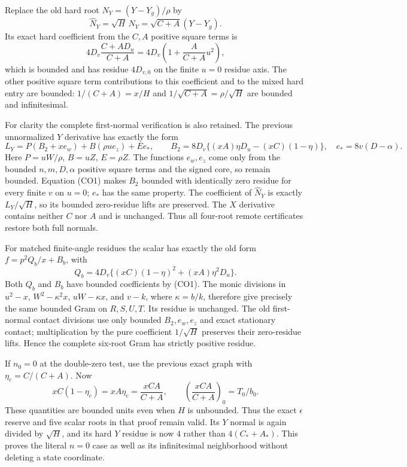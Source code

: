 Replace the old hard root $N_Y=(Y-Y_g)/\rho$ by
\[
        \widehat N_Y=\sqrt H\,N_Y=\sqrt{C+A}(Y-Y_g).
                                                               \tag{CO3}
\]
Its exact hard coefficient from the $C,A$ positive square terms is
\[
             4D_v\frac{C+AD_u}{C+A}
       =4D_v\left(1+\frac{A}{C+A}u^2\right),             \tag{CO4}
\]
which is bounded and has residue $4D_{v,0}$ on the finite $u=0$
residue axis.  The other positive square term contributions to this coefficient
and to the mixed hard entry are bounded: $1/(C+A)=x/H$ and
$1/\sqrt{C+A}=\rho/\sqrt H$ are bounded and infinitesimal.

For clarity the complete first-normal verification is also retained.
The previous unnormalized $Y$ derivative has exactly the form
\[
 L_Y=P(B_2+xe_w)+B(\rho u e_z)+E e_*,\qquad
 B_2=8D_v\{(xA)\eta D_u-(xC)(1-\eta)\},
 \quad e_*=8v(D-\alpha).                                \tag{CO5}
\]
Here $P=uW/\rho$, $B=uZ$, $E=\rho Z$.  The functions $e_w,e_z$
come only from the bounded $n,m,D,\alpha$ positive square terms and the signed
core, so remain bounded.  Equation (CO1) makes $B_2$ bounded with
identically zero residue for every finite $v$ on $u=0$; $e_*$ has
the same property.  The coefficient of $\widehat N_Y$ is exactly
$L_Y/\sqrt H$, so its bounded zero-residue lifts are preserved.
The $X$ derivative contains neither $C$ nor $A$ and is unchanged.
Thus all four-root remote certificates restore both full normals.

For matched finite-angle residues the scalar has exactly the old
form $f=p^2Q_b/x+B_b$, with
\[
 Q_b=4D_v\{(xC)(1-\eta)^2+(xA)\eta^2D_u\}.
\]
Both $Q_b$ and $B_b$ have bounded coefficients by (CO1).  The monic
divisions in $u^2-x$, $W^2-\kappa^2x$, $uW-\kappa x$, and $v-k$,
where $\kappa=b/k$, therefore give precisely the same bounded Gram
on $R,S,U,T$.  Its residue is unchanged.  The old first-normal
contact divisions use only bounded $B_2,e_w,e_z$ and exact stationary
contact; multiplication by the pure coefficient $1/\sqrt H$
preserves their zero-residue lifts.  Hence the complete six-root
Gram has strictly positive residue.

If $n_0=0$ at the double-zero test, use the previous exact graph
with $\eta_c=C/(C+A)$.  Now
\[
 xC(1-\eta_c)=xA\eta_c=\frac{xCA}{C+A},
 \qquad
 \left(\frac{xCA}{C+A}\right)_0=T_0/b_0.                \tag{CO6}
\]
These quantities are bounded units even when $H$ is unbounded.
Thus the exact $\epsilon$ reserve and five scalar roots in that
proof remain valid.  Its $Y$ normal is again divided by $\sqrt H$,
and its hard $Y$ residue is now $4$ rather than $4(C_*+A_*)$.
This proves the literal $n=0$ case as well as its infinitesimal
neighborhood without deleting a state coordinate.

